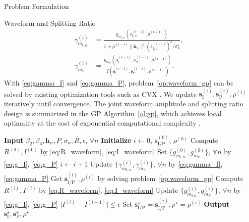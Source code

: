 \documentclass[journal]{IEEEtran}
\begin{document}
\begin{section}{Problem Formulation}
\begin{subsection}{Waveform and Splitting Ratio}
			\begin{align}
				\gamma_{m_{\mathrm{I},n}}^{(i)} & = \frac{g_{m_{\mathrm{I},n}}(s_{\mathrm{I},n}^{(i-1)},\bar{\rho}^{(i-1)})}{1+{\bar{\rho}^{(i-1)}\lVert{\boldsymbol{h}_n}\rVert^2 (s_{\mathrm{I},n}^{(i-1)})^2}\big/{\sigma_n^2}}\label{eq:gamma_I},\\
				\gamma_{m_\mathrm{P}}^{(i)} & = \frac{g_{m_\mathrm{P}}(\boldsymbol{s}_{\mathrm{I}}^{(i-1)},\boldsymbol{s}_\mathrm{P}^{(i-1)},\rho^{(i-1)})}{I(\boldsymbol{s}_{\mathrm{I}}^{(i-1)},\boldsymbol{s}_\mathrm{P}^{(i-1)},\rho^{(i-1)})}\label{eq:gamma_P}.
			\end{align}
			With \eqref{eq:gamma_I} and \eqref{eq:gamma_P}, problem~\eqref{op:waveform_gp} can be solved by existing optimization tools such as CVX \cite{Grant2008}. We update $\boldsymbol{s}_{\mathrm{I}}^{(i)},\boldsymbol{s}_\mathrm{P}^{(i)},\rho^{(i)}$ iteratively until convergence. The joint waveform amplitude and splitting ratio design is summarized in the GP Algorithm~\ref{al:gp}, which achieves local optimality at the cost of exponential computational complexity \cite{Chiang2005}.

			\begin{algorithm}[!t]
				\caption{GP: Waveform Amplitude and Splitting Ratio.}
				\label{al:gp}
				\begin{algorithmic}[1]
					\State \textbf{Input} $\beta_2,\beta_4,\boldsymbol{h}_n,P,\sigma_n,\bar{R},\epsilon$, $\forall n$
					\State \textbf{Initialize} $i \gets 0$, $\boldsymbol{s}_{\mathrm{I/P}}^{(0)}$, $\rho^{(0)}$
					\State Compute $R^{(0)},I^{(0)}$ by \eqref{eq:R_waveform}, \eqref{eq:I_waveform}
					\State Set $\{g_{m_{\mathrm{I},n}}^{(0)},g_{m_\mathrm{P}}^{(0)}\}$, $\forall n$ by \eqref{eq:g_I}, \eqref{eq:g_P}
					\Repeat
						\State $i \gets i + 1$
						\State Update $\{\gamma_{m_{\mathrm{I},n}}^{(i)},\gamma_{m_\mathrm{P}}^{(i)}\}$, $\forall n$ by \eqref{eq:gamma_I}, \eqref{eq:gamma_P}
						\State Get $\boldsymbol{s}_{\mathrm{I/P}}^{(i)},\rho^{(i)}$ by solving problem~\eqref{op:waveform_gp}
						\State Compute $R^{(i)},I^{(i)}$ by \eqref{eq:R_waveform}, \eqref{eq:I_waveform}
						\State Update $\{g_{m_{\mathrm{I},n}}^{(i)},g_{m_\mathrm{P}}^{(i)}\}$, $\forall n$ by \eqref{eq:g_I}, \eqref{eq:g_P}
					\Until $\lvert I^{(i)} - I^{(i-1)} \rvert \le \epsilon$
					\State Set $\boldsymbol{s}_{\mathrm{I/P}}^{\star}=\boldsymbol{s}_{\mathrm{I/P}}^{(i)},\rho^{\star}=\rho^{(i)}$
					\State \textbf{Output} $\boldsymbol{s}_{\mathrm{I}}^{\star},\boldsymbol{s}_{\mathrm{P}}^{\star},\rho^{\star}$
				\end{algorithmic}
			\end{algorithm}


\end{subsection}
\end{section}
\end{document}
